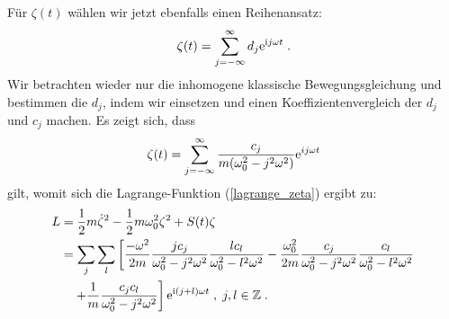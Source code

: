   Für $\zeta(t)$ wählen wir jetzt ebenfalls einen Reihenansatz:
  \begin{equation}
    \zeta(t) = \sum_{j=-\infty}^\infty d_j \text e^{\text ij\omega t} \; .
  \end{equation}
  Wir betrachten wieder nur die inhomogene klassische Bewegungsgleichung und bestimmen die $d_j$, indem wir einsetzen und einen Koeffizientenvergleich der $d_j$ und $c_j$ machen.
  Es zeigt sich, dass
  \begin{equation}
    \zeta(t) = \sum_{j=-\infty}^\infty \frac{c_j}{m(\omega_0^2-j^2\omega^2)} \text e^{ij\omega t}
    \label{zeta_bel_kraft}
  \end{equation}
  gilt, womit sich die Lagrange-Funktion (\ref{lagrange_zeta}) ergibt zu:
  \begin{align}
    \begin{split}
      L &= \frac{1}{2}m\dot \zeta^2 - \frac{1}{2}m\omega_0^2\zeta^2 + S(t)\zeta \notag\\
       &=\sum_j \sum_l \left[ \frac{-\omega^2}{2m} \frac{jc_j}{\omega_0^2-j^2\omega^2} \frac{lc_l}{\omega_0^2-l^2\omega^2}
       -\frac{\omega_0^2}{2m} \frac{c_j}{\omega_0^2-j^2\omega^2} \frac{c_l}{\omega_0^2-l^2\omega^2} \right. \notag\\
        &\left. \quad + \frac{1}{m} \frac{c_jc_l}{\omega_0^2-j^2\omega^2} \right] \text e^{\text i(j+l)\omega t}  \; , \; j,l \in \mathbb{Z} \; .
     \end{split}
   \end{align}
  \iffalse
  \begin{align}
    \begin{split}
      L &= \frac{1}{2}m\dot \zeta^2 - \frac{1}{2}m\omega_0^2\zeta^2 + S(t)\zeta \\
       &=\frac{-\omega^2}{2m} \sum_j \sum_l \frac{jc_j}{\omega_0^2-j^2\omega^2} \frac{lc_l}{\omega_0^2-l^2\omega^2} \text e^{\text i(j+l)\omega t}\\
       &\quad-\frac{\omega_0^2}{2m} \sum_j \sum_l \frac{c_j}{\omega_0^2-j^2\omega^2} \frac{c_l}{\omega_0^2-l^2\omega^2} \text e^{\text i(j+l)\omega t}\\
       &\quad + \frac{1}{m} \sum_j \sum_l \frac{c_jc_l}{\omega_0^2-j^2\omega^2} \text e^{\text i(j+l)\omega t}\; , \; j,l \in \mathbb{Z} \; .
     \end{split}
   \end{align}
   \fi

